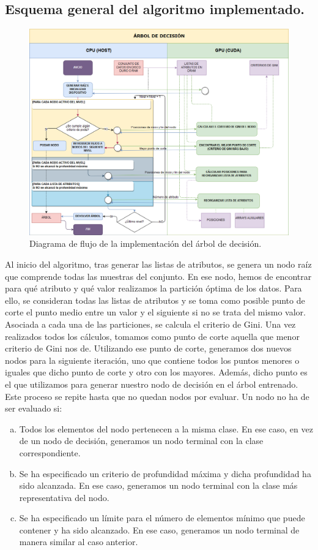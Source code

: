 \subsection{Esquema general del algoritmo implementado.}
\begin{figure}[ht]
\centering
\includegraphics[scale=0.35]{imagenes/esquemadtree.png}
\caption{Diagrama de flujo de la implementación del árbol de decisión.}
\label{img:dtree}
\end{figure}
Al inicio del algoritmo, tras generar las listas de atributos, se genera un nodo raíz que comprende todas las muestras del conjunto. En ese nodo, hemos de encontrar para qué atributo y qué valor realizamos la partición óptima de los datos. Para ello, se consideran todas las listas de atributos y se toma como posible punto de corte el punto medio entre un valor y el siguiente si no se trata del mismo valor. Asociada a cada una de las particiones, se calcula el criterio de Gini. Una vez realizados todos los cálculos, tomamos como punto de corte aquella que menor criterio de Gini nos de. Utilizando ese punto de corte, generamos dos nuevos nodos para la siguiente iteración, uno que contiene todos los puntos menores o iguales que dicho punto de corte y otro con los mayores. Además, dicho punto es el que utilizamos para generar nuestro nodo de decisión en el árbol entrenado.  Este proceso se repite hasta que no quedan nodos por evaluar. Un nodo no ha de ser evaluado si:\\

\begin{enumerate}[a.]
    \item Todos los elementos del nodo pertenecen a la misma clase. En ese caso, en vez de un nodo de decisión, generamos un nodo terminal con la clase correspondiente.
    \item Se ha especificado un criterio de profundidad máxima y dicha profundidad ha sido alcanzada. En ese caso, generamos un nodo terminal con la clase más representativa del nodo.
    \item Se ha especificado un límite para el número de elementos mínimo que puede contener y ha sido alcanzado. En ese caso, generamos un nodo terminal de manera similar al caso anterior.
\end{enumerate}



